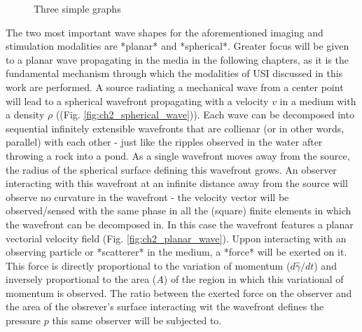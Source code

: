 \begin{figure}[ht]
     \centering
    \caption{Three simple graphs}
\end{figure}

The two most important wave shapes for the aforementioned imaging and stimulation modalities 
are *planar* and *spherical*. Greater focus will be given to a planar wave propagating 
in the media in the following chapters, as it is the fundamental mechanism through 
which the modalities of USI discussed in this work are performed.
A source radiating a mechanical wave from a center point will lead to a spherical wavefront 
propagating with a velocity $v$ in a medium with a density $\rho$ ((Fig. \ref{fig:ch2_spherical_wave})). 
Each wave can be decomposed into sequential infinitely extensible wavefronts that are collienar 
(or in other words, parallel) with each other - just like the ripples observed in the water 
after throwing a rock into a pond. As a single wavefront moves away from the source,
the radius of the spherical surface defining this wavefront grows. An observer interacting 
with this wavefront at an infinite distance away from the source will observe no curvature 
in the wavefront - the velocity vector will be observed/sensed with the same phase in 
all the (square) finite elements in which the wavefront can be decomposed in. In this case 
the wavefront features a planar vectorial velocity field (Fig. \ref{fig:ch2_planar_wave}).
Uppon interacting with an observing particle or *scatterer* in the medium, a *force* will be exerted on it. 
This force is directly proportional to the variation of momentum ($d\hat{\gamma} / dt$) and inversely 
proportional to the area ($A$) of the region in which this variational of momentum is observed. The 
ratio between the exerted force on the observer and the area of the obsrever's surface interacting wit 
the wavefront defines the pressure $p$ this same observer will be subjected to.


